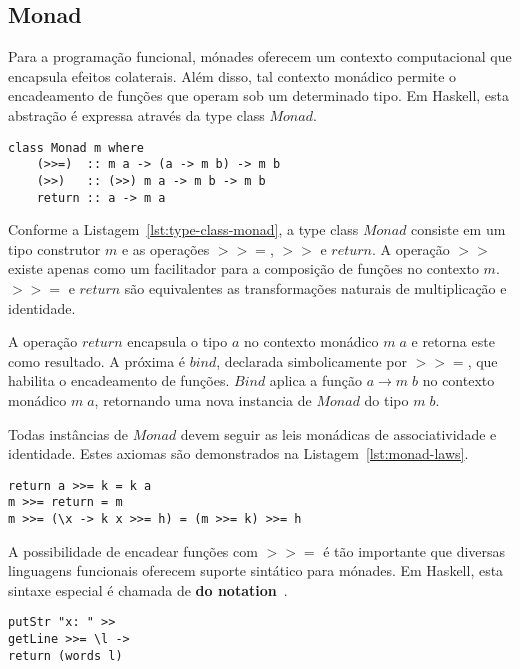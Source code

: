 \documentclass[10pt, conference]{IEEEtran}
\begin{document}
\subsection{Monad}

Para a programação funcional, mónades oferecem um contexto computacional que encapsula efeitos colaterais. Além disso, tal contexto monádico permite o encadeamento de funções que operam sob um determinado tipo. Em Haskell, esta abstração é expressa através da type class $Monad$.

\begin{lstlisting}[caption={Type class Monad\protect\footref{fnt:haskell-language-report}}, label={lst:type-class-monad}]
class Monad m where
	(>>=)  :: m a -> (a -> m b) -> m b
	(>>)   :: (>>) m a -> m b -> m b
	return :: a -> m a
\end{lstlisting}

Conforme a Listagem~\ref{lst:type-class-monad}, a type class $Monad$ consiste em um tipo construtor $m$ e as operações $>>=$, $>>$ e $return$. A operação $>>$ existe apenas como um facilitador para a composição de funções no contexto $m$. $>>=$ e $return$ são equivalentes as transformações naturais de multiplicação e identidade.

A operação $return$ encapsula o tipo $a$ no contexto monádico $m\;a$ e retorna este como resultado. A próxima é $bind$, declarada simbolicamente por $>>=$, que habilita o encadeamento de funções. $Bind$ aplica a função $a \rightarrow m\;b$ no contexto monádico $m\;a$, retornando uma nova instancia de $Monad$ do tipo $m\;b$.

Todas instâncias de $Monad$ devem seguir as leis monádicas de associatividade e identidade. Estes axiomas são demonstrados na Listagem~\ref{lst:monad-laws}.

\begin{lstlisting}[caption={Leis para $Monad$\protect\footref{fnt:haskell-language-report}}, label={lst:monad-laws}]
return a >>= k = k a
m >>= return = m
m >>= (\x -> k x >>= h) = (m >>= k) >>= h
\end{lstlisting}

A possibilidade de encadear funções com $>>=$ é tão importante que diversas linguagens funcionais oferecem suporte sintático para mónades. Em Haskell, esta sintaxe especial é chamada de \textbf{do notation}~\cite{marlow2010haskell}.

\begin{lstlisting}[caption={Encadeando Funções com Bind e Then\protect\footref{fnt:haskell-language-report}}, label={lst:func-chaining}]
putStr "x: " >>
getLine >>= \l -> 
return (words l)
\end{lstlisting}
\end{document}
